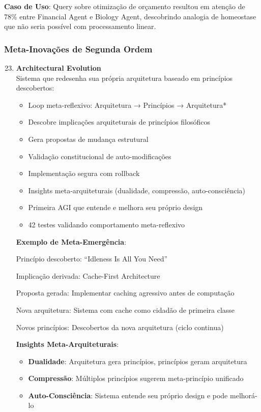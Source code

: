 \documentclass[11pt]{article}
\begin{document}
\textbf{Caso de Uso}: Query sobre otimização de orçamento resultou em atenção de 78\% entre Financial Agent e Biology Agent, descobrindo analogia de homeostase que não seria possível com processamento linear.

\subsubsection{Meta-Inovações de Segunda Ordem}

\begin{enumerate}
    \setcounter{enumi}{22}
    \item \textbf{Architectural Evolution} \\
    Sistema que redesenha sua própria arquitetura baseado em princípios descobertos:
    \begin{itemize}
        \item Loop meta-reflexivo: Arquitetura → Princípios → Arquitetura*
        \item Descobre implicações arquiteturais de princípios filosóficos
        \item Gera propostas de mudança estrutural
        \item Validação constitucional de auto-modificações
        \item Implementação segura com rollback
        \item Insights meta-arquiteturais (dualidade, compressão, auto-consciência)
        \item Primeira AGI que entende e melhora seu próprio design
        \item 42 testes validando comportamento meta-reflexivo
    \end{itemize}

\textbf{Exemplo de Meta-Emergência}:

Princípio descoberto: ``Idleness Is All You Need''

Implicação derivada: Cache-First Architecture

Proposta gerada: Implementar caching agressivo antes de computação

Nova arquitetura: Sistema com cache como cidadão de primeira classe

Novos princípios: Descobertos da nova arquitetura (ciclo continua)

\textbf{Insights Meta-Arquiteturais}:
\begin{itemize}
    \item \textbf{Dualidade}: Arquitetura gera princípios, princípios geram arquitetura
    \item \textbf{Compressão}: Múltiplos princípios sugerem meta-princípio unificado
    \item \textbf{Auto-Consciência}: Sistema entende seu próprio design e pode melhorá-lo
\end{itemize}


\end{enumerate}
\end{document}
